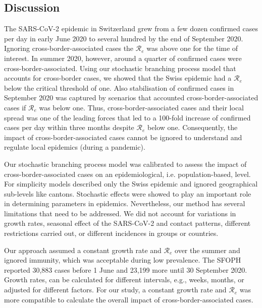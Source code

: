 \documentclass[10pt, a4paper, twoside]{article}
\begin{document}
\begin{multicols}{2}
\section{Discussion}
The SARS-CoV-2 epidemic in Switzerland grew from a few dozen confirmed cases per day in early June 2020 to several hundred by the end of September 2020.
Ignoring cross-border-associated cases the $\mathcal{R}_e$ was above one for the time of interest.
In summer 2020, however, around a quarter of confirmed cases were cross-border-associated.
Using our stochastic branching process model that accounts for cross-border cases, we showed that the Swiss epidemic had a $\mathcal{R}_e$ below the critical threshold of one. 
Also stabilisation of confirmed cases in September 2020 was captured by scenarios that accounted cross-border-associated cases if $\mathcal{R}_e$ was below one.
Thus, cross-border-associated cases and their local spread was one of the leading forces that led to a 100-fold increase of confirmed cases per day within three months despite $\mathcal{R}_e$ below one.
Consequently, the impact of cross-border-associated cases cannot be ignored to understand and regulate local epidemics (during a pandemic).
\break
\par
Our stochastic branching process model was calibrated to assess the impact of cross-border-associated cases on an epidemiological, i.e. population-based, level.
For simplicity models described only the Swiss epidemic and ignored geographical sub-levels like cantons.
Stochastic effects were showed to play an important role in determining parameters in epidemics.\cite{althaus_ebola_2015,riou_pattern_2020}
Nevertheless, our method has several limitations that need to be addressed.
We did not account for variations in growth rates, seasonal effect of the SARS-CoV-2 and contact patterns, different restrictions carried out, or different incidences in groups or countries.

Our approach assumed a constant growth rate and $\mathcal{R}_e$ over the summer and ignored immunity, which was acceptable during low prevalence.
The SFOPH reported 30,883 cases before 1 June and 23,199 more until 30 September 2020.
Growth rates, can be calculated for different intervals, e.g., weeks, months, or adjusted for different factors.
For our study, a constant growth rate and $\mathcal{R}_e$ was more compatible to calculate the overall impact of cross-border-associated cases.


\end{multicols}
\end{document}

